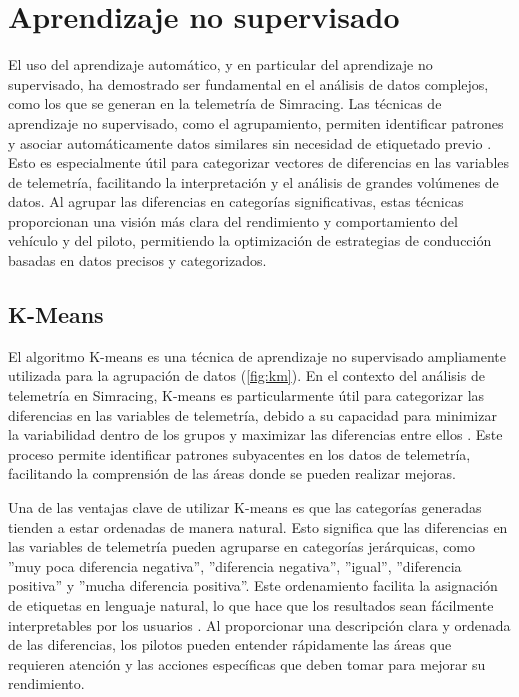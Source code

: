 \section{Aprendizaje no supervisado}
El uso del aprendizaje automático, y en particular del aprendizaje no supervisado, ha demostrado ser fundamental en el análisis de datos complejos, como los que se generan en la telemetría de Simracing. Las técnicas de aprendizaje no supervisado, como el agrupamiento, permiten identificar patrones y asociar automáticamente datos similares sin necesidad de etiquetado previo \cite{Jain1988, Duda2000}. Esto es especialmente útil para categorizar vectores de diferencias en las variables de telemetría, facilitando la interpretación y el análisis de grandes volúmenes de datos. Al agrupar las diferencias en categorías significativas, estas técnicas proporcionan una visión más clara del rendimiento y comportamiento del vehículo y del piloto, permitiendo la optimización de estrategias de conducción basadas en datos precisos y categorizados\cite{Hastie2009, Bishop2006}.

\subsection{K-Means}
El algoritmo K-means es una técnica de aprendizaje no supervisado ampliamente utilizada para la agrupación de datos (\autoref{fig:km}). En el contexto del análisis de telemetría en Simracing, K-means es particularmente útil para categorizar las diferencias en las variables de telemetría, debido a su capacidad para minimizar la variabilidad dentro de los grupos y maximizar las diferencias entre ellos \cite{MacQueen1967}. Este proceso permite identificar patrones subyacentes en los datos de telemetría, facilitando la comprensión de las áreas donde se pueden realizar mejoras.

Una de las ventajas clave de utilizar K-means es que las categorías generadas tienden a estar ordenadas de manera natural. Esto significa que las diferencias en las variables de telemetría pueden agruparse en categorías jerárquicas, como ''muy poca diferencia negativa'', ''diferencia negativa'', ''igual'', ''diferencia positiva'' y ''mucha diferencia positiva''. Este ordenamiento facilita la asignación de etiquetas en lenguaje natural, lo que hace que los resultados sean fácilmente interpretables por los usuarios \cite{Jain1988, Hartigan1979}. Al proporcionar una descripción clara y ordenada de las diferencias, los pilotos pueden entender rápidamente las áreas que requieren atención y las acciones específicas que deben tomar para mejorar su rendimiento.

